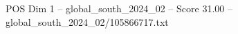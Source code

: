 \begin{textsample}{POS Dim 1 – global\_south\_2024\_02 – Score 31.00 – global\_south\_2024\_02/105866717.txt}
\end{textsample}

